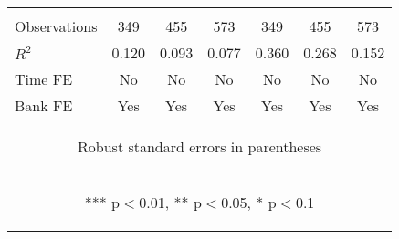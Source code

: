 \documentclass[]{article}
\begin{document}
\begin{center}
\begin{tabular}{lcccccc}
\vspace{4pt} & \begin{footnotesize}\end{footnotesize} & \begin{footnotesize}\end{footnotesize} & \begin{footnotesize}\end{footnotesize} & \begin{footnotesize}\end{footnotesize} & \begin{footnotesize}\end{footnotesize} & \begin{footnotesize}\end{footnotesize} \\
Observations & 349 & 455 & 573 & 349 & 455 & 573 \\
$R^2$ & 0.120 & 0.093 & 0.077 & 0.360 & 0.268 & 0.152 \\
Time FE & No & No & No & No & No & No \\
 Bank FE & Yes & Yes & Yes & Yes & Yes & Yes \\ \hline
\multicolumn{7}{c}{\begin{footnotesize} Robust standard errors in parentheses\end{footnotesize}} \\
\multicolumn{7}{c}{\begin{footnotesize} *** p$<$0.01, ** p$<$0.05, * p$<$0.1\end{footnotesize}} \\
\end{tabular}
\end{center}
\end{document}
